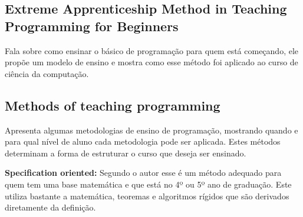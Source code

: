 \subsection{Extreme Apprenticeship Method in Teaching Programming for Beginners} \nocite{Vihavainen:2011:EAM:1953163.1953196}
\label{subsec:vihavainen}
Fala sobre como ensinar o básico de programação para quem está começando, ele propõe um modelo de ensino e mostra como esse método foi aplicado ao curso de ciência da computação.

\subsection{Methods of teaching programming} 
\nocite{methods}
\label{subsec:methods}
 Apresenta algumas metodologias de ensino de programação, mostrando quando e para qual nível de aluno cada metodologia pode ser aplicada. Estes métodos determinam a forma de estruturar o curso que deseja ser ensinado. 

	\textbf{Specification oriented:} Segundo o autor esse é um método adequado para quem tem uma base matemática e que está no 4º ou 5º ano de graduação. Este utiliza bastante a matemática, teoremas e algoritmos rígidos que são derivados diretamente da definição. 


 



